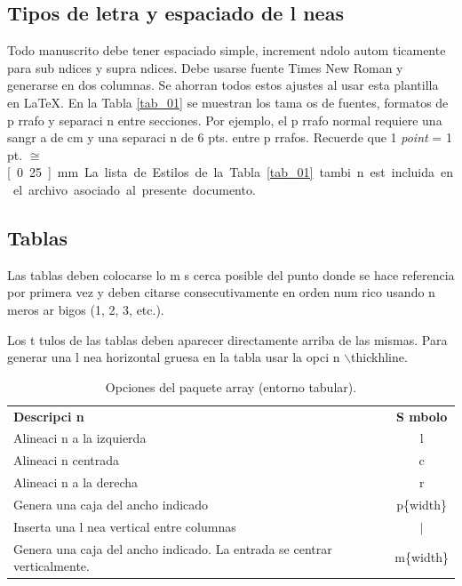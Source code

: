 \documentclass{article}
\begin{document}
\subsection{Tipos de letra y espaciado de l neas}

Todo manuscrito debe tener espaciado simple, increment ndolo autom ticamente para sub ndices y supra ndices. Debe usarse fuente Times New Roman y generarse en dos columnas. Se ahorran todos estos ajustes al usar esta plantilla en \LaTeX.
En la Tabla \ref{tab_01} se muestran los tama os de fuentes, formatos de p rrafo y separaci n entre secciones. Por ejemplo, el p rrafo normal requiere una sangr a de \unit[1]{cm} y una separaci n de 6 pts. entre p rrafos. Recuerde que 1 \emph{point} = 1 pt. $\cong$ \unit[0.25]{mm}. La lista de Estilos de la Tabla \ref{tab_01} tambi n est  incluida en el archivo asociado al presente documento.

\subsection{Tablas}

Las tablas deben colocarse lo m s cerca posible del punto donde se hace referencia por primera vez y deben citarse consecutivamente en orden num rico usando n meros ar bigos (1, 2, 3, etc.). 

Los t tulos de las tablas deben aparecer directamente arriba de las mismas.  Para generar una l nea horizontal gruesa en la tabla usar la opci n \color{Blue}\textsf{$\backslash$thickhline}\color{Black}. 

\begin{table}[ht]
\caption{ Opciones del paquete \textsf{array} (entorno \textsf{tabular}).}
\label{tab_02}
    \centering
    \small           %
    \begin{tabular}{|m{5.5cm}|c|}
    \hline
    \centering
    \textbf{Descripci n} & \textbf{S mbolo}  \\ 
    \thickhline
    Alineaci n a la izquierda & l  \\ 
    \hline
    Alineaci n centrada & c  \\ 
    \hline
    Alineaci n a la derecha & r \\
    \hline
    Genera una caja del ancho indicado & p\{width\} \\
    \hline
    Inserta una l nea vertical entre columnas & $\mid$ \\
    \hline
    Genera una caja del ancho indicado. La entrada se centrar  verticalmente.  &  m\{width\}  \\
    \hline
    \end{tabular}
\end{table}
\end{document}
